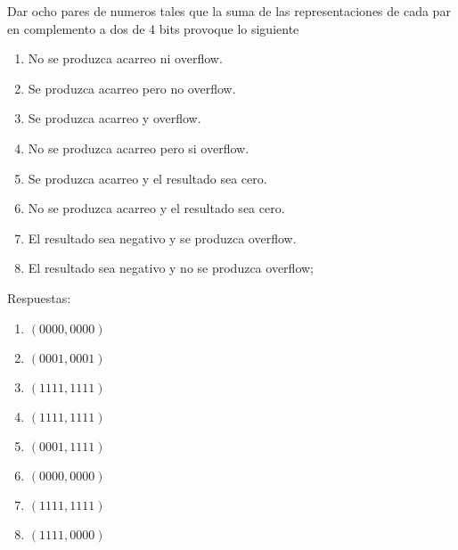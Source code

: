 \begin{enunciado}{\ejercicio}

Dar ocho pares de numeros tales que la suma de las representaciones de cada
par en complemento a dos de 4 bits provoque lo siguiente
\begin{enumerate}
    \item No se produzca acarreo ni overflow.
    \item Se produzca acarreo pero no overflow.
    \item Se produzca acarreo y overflow.
    \item No se produzca acarreo pero si overflow.
    \item Se produzca acarreo y el resultado sea cero.
    \item No se produzca acarreo y el resultado sea cero.
    \item El resultado sea negativo y se produzca overflow.
    \item El resultado sea negativo y no se produzca overflow;


\end{enumerate}

Respuestas: 

\begin{enumerate}
    \item $(0000, 0000)$
    \item $(0001, 0001)$
    \item $(1111, 1111)$
    \item $(1111, 1111)$
    \item $(0001, 1111)$
    \item $(0000, 0000)$
    \item $(1111, 1111)$
    \item $(1111, 0000)$


\end{enumerate}
\end{enunciado}

